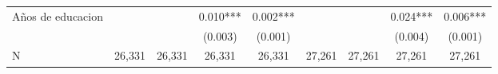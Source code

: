 \begin{table}
{\begin{threeparttable}
\begin{tabular}{lcccccccc}
Años de educacion   &               &               &       0.010***&       0.002***&               &               &       0.024***&       0.006***\\
                    &               &               &     (0.003)   &     (0.001)   &               &               &     (0.004)   &     (0.001)   \\
\midrule
N                   &      26,331   &      26,331   &      26,331   &      26,331   &      27,261   &      27,261   &      27,261   &      27,261   \\
\hline
\end{tabular}
\begin{tablenotes}
\begin{footnotesize}
\end{footnotesize}
\end{tablenotes} \end{threeparttable} } \end{table}
